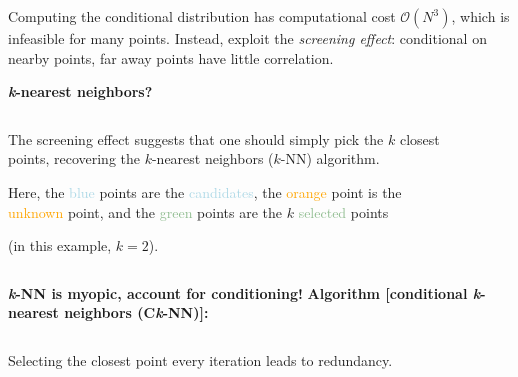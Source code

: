 \documentclass{beamer}                             %
\newcommand{\blocktitle}[1]{{\Large \textbf{#1}}}
\newcommand*{\BigO}{\mathcal{O}}
\begin{document}
\begin{frame}[t]
\begin{columns}[T]
\begin{column}{0.30\textwidth}
\begin{tcolorbox}
    Computing the conditional distribution has computational
    cost \( \BigO(N^3) \), which is infeasible for many points.
    Instead, exploit the \emph{screening effect}: conditional
    on nearby points, far away points have little correlation.
    \begin{figure}[t]
      \centering
      
      \label{fig:screening}
    \end{figure}
  \end{tcolorbox}

  \begin{tcolorbox}
    \blocktitle{\textit{k}-nearest neighbors?}
    \vspace{0.25\baselineskip}

    \begin{columns}
      \hfill
      \begin{column}{0.5\textwidth}
        The screening effect suggests that one should simply
        pick the \( k \) closest points, recovering the
        \( k \)-nearest neighbors (\( k \)-NN) algorithm.

        \vspace{\baselineskip}
        Here, the \textcolor{lightblue}{blue} points are the
        \textcolor{lightblue}{candidates}, the \textcolor{orange}{orange}
        point is the \textcolor{orange}{unknown} point, and the
        \textcolor{darkseagreen}{green} points are the \( k \)
        \textcolor{darkseagreen}{selected} points

        (in this example, \( k = 2 \)).
      \end{column}
      \begin{column}{0.5\textwidth}
        \begin{figure}[t]
          \centering
          
          \label{fig:selection_knn}
        \end{figure}
      \end{column}
    \end{columns}
  \end{tcolorbox}

  \begin{tcolorbox}
    \blocktitle{\textit{k}-NN is myopic, account for conditioning!}
    \textbf{
      Algorithm [conditional \textit{k}-nearest neighbors (C\textit{k}-NN)]:
    }
    \vspace{-0.5\baselineskip}
    \begin{columns}
      \hfill
      \begin{column}{0.5\textwidth}
        Selecting the closest point every iteration leads to redundancy.


\end{column}
\end{columns}
\end{tcolorbox}
\end{column}
\end{columns}
\end{frame}
\end{document}
